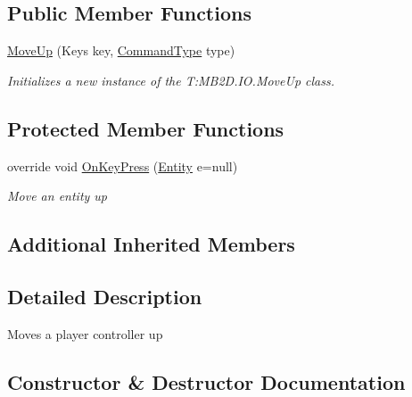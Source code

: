 \subsection*{Public Member Functions}
\begin{DoxyCompactItemize}
\item 
\hyperlink{class_m_b2_d_1_1_i_o_1_1_move_up_aa89faa4b42d3073b1fe6ddbd3da1e4f9}{Move\+Up} (Keys key, \hyperlink{namespace_m_b2_d_1_1_i_o_ab5f95f3fe9e652778b62bdf943168a68}{Command\+Type} type)
\begin{DoxyCompactList}\small\item\em Initializes a new instance of the T\+:\+M\+B2\+D.\+I\+O.\+Move\+Up class. \end{DoxyCompactList}\end{DoxyCompactItemize}
\subsection*{Protected Member Functions}
\begin{DoxyCompactItemize}
\item 
override void \hyperlink{class_m_b2_d_1_1_i_o_1_1_move_up_acb3f90aeea44eeffefbb664e898b0a91}{On\+Key\+Press} (\hyperlink{class_m_b2_d_1_1_entity_component_1_1_entity}{Entity} e=null)
\begin{DoxyCompactList}\small\item\em Move an entity up \end{DoxyCompactList}\end{DoxyCompactItemize}
\subsection*{Additional Inherited Members}


\subsection{Detailed Description}
Moves a player controller up 



\subsection{Constructor \& Destructor Documentation}
\hypertarget{class_m_b2_d_1_1_i_o_1_1_move_up_aa89faa4b42d3073b1fe6ddbd3da1e4f9}{}\label{class_m_b2_d_1_1_i_o_1_1_move_up_aa89faa4b42d3073b1fe6ddbd3da1e4f9} 
